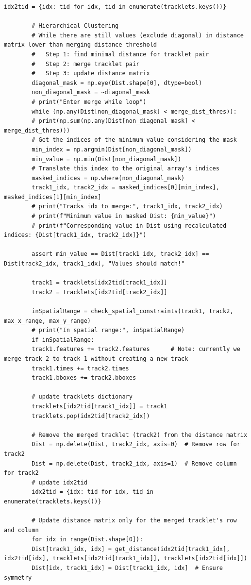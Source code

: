 \documentclass[12pt, a4paper, twoside]{article}
\begin{document}
\begin{lstlisting}[style=pythonstyle]
		idx2tid = {idx: tid for idx, tid in enumerate(tracklets.keys())}
		
		# Hierarchical Clustering
		# While there are still values (exclude diagonal) in distance matrix lower than merging distance threshold
		#   Step 1: find minimal distance for tracklet pair
		#   Step 2: merge tracklet pair
		#   Step 3: update distance matrix
		diagonal_mask = np.eye(Dist.shape[0], dtype=bool)
		non_diagonal_mask = ~diagonal_mask
		# print("Enter merge while loop")
		while (np.any(Dist[non_diagonal_mask] < merge_dist_thres)):
		# print(np.sum(np.any(Dist[non_diagonal_mask] < merge_dist_thres)))
		# Get the indices of the minimum value considering the mask
		min_index = np.argmin(Dist[non_diagonal_mask])
		min_value = np.min(Dist[non_diagonal_mask])
		# Translate this index to the original array's indices
		masked_indices = np.where(non_diagonal_mask)
		track1_idx, track2_idx = masked_indices[0][min_index], masked_indices[1][min_index]
		# print("Tracks idx to merge:", track1_idx, track2_idx)
		# print(f"Minimum value in masked Dist: {min_value}")
		# print(f"Corresponding value in Dist using recalculated indices: {Dist[track1_idx, track2_idx]}")
		
		assert min_value == Dist[track1_idx, track2_idx] == Dist[track2_idx, track1_idx], "Values should match!"
		
		track1 = tracklets[idx2tid[track1_idx]]
		track2 = tracklets[idx2tid[track2_idx]]
		
		inSpatialRange = check_spatial_constraints(track1, track2, max_x_range, max_y_range)
		# print("In spatial range:", inSpatialRange)
		if inSpatialRange:
		track1.features += track2.features      # Note: currently we merge track 2 to track 1 without creating a new track
		track1.times += track2.times
		track1.bboxes += track2.bboxes
		
		# update tracklets dictionary
		tracklets[idx2tid[track1_idx]] = track1
		tracklets.pop(idx2tid[track2_idx])
		
		# Remove the merged tracklet (track2) from the distance matrix
		Dist = np.delete(Dist, track2_idx, axis=0)  # Remove row for track2
		Dist = np.delete(Dist, track2_idx, axis=1)  # Remove column for track2
		# update idx2tid
		idx2tid = {idx: tid for idx, tid in enumerate(tracklets.keys())}
		
		# Update distance matrix only for the merged tracklet's row and column
		for idx in range(Dist.shape[0]):
		Dist[track1_idx, idx] = get_distance(idx2tid[track1_idx], idx2tid[idx], tracklets[idx2tid[track1_idx]], tracklets[idx2tid[idx]])
		Dist[idx, track1_idx] = Dist[track1_idx, idx]  # Ensure symmetry
		

\end{lstlisting}
\end{document}
